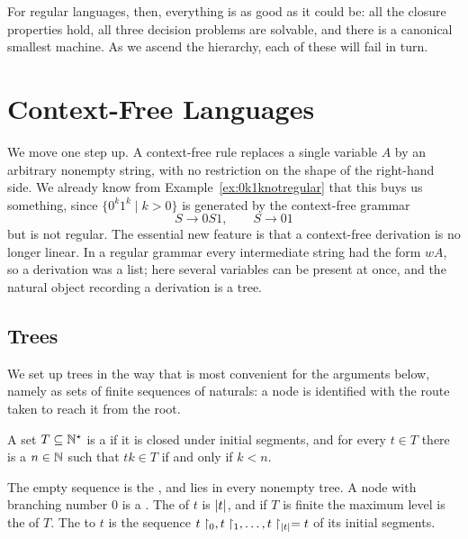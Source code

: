 \documentclass[a4paper]{scrartcl}
\begin{document}
For regular languages, then, everything is as good as it could be: all the closure properties hold, all three decision problems are solvable, and there is a canonical smallest machine. As we ascend the hierarchy, each of these will fail in turn.

\section{Context-Free Languages}\label{sec:cfl}

We move one step up. A context-free rule replaces a single variable $A$ by an arbitrary nonempty string, with no restriction on the shape of the right-hand side. We already know from Example~\ref{ex:0k1knotregular} that this buys us something, since $\{0^k1^k \mid k > 0\}$ is generated by the context-free grammar
$$S \to 0S1, \qquad S \to 01$$
but is not regular. The essential new feature is that a context-free derivation is no longer linear. In a regular grammar every intermediate string had the form $wA$, so a derivation was a list; here several variables can be present at once, and the natural object recording a derivation is a tree.

\subsection{Trees}

We set up trees in the way that is most convenient for the arguments below, namely as sets of finite sequences of naturals: a node is identified with the route taken to reach it from the root.

\begin{definition}[Tree]
	A set $T \subseteq \mathbb{N}^\star$ is a  if it is closed under initial segments, and for every $t \in T$ there is a  $n \in \mathbb{N}$ such that $tk \in T$ if and only if $k < n$.

	The empty sequence is the , and lies in every nonempty tree. A node with branching number $0$ is a . The  of $t$ is $\lvert t\rvert$, and if $T$ is finite the maximum level is the  of $T$. The  to $t$ is the sequence $t\restriction_0, t\restriction_1, \dots, t\restriction_{\lvert t\rvert} = t$ of its initial segments.
\end{definition}
\end{document}
